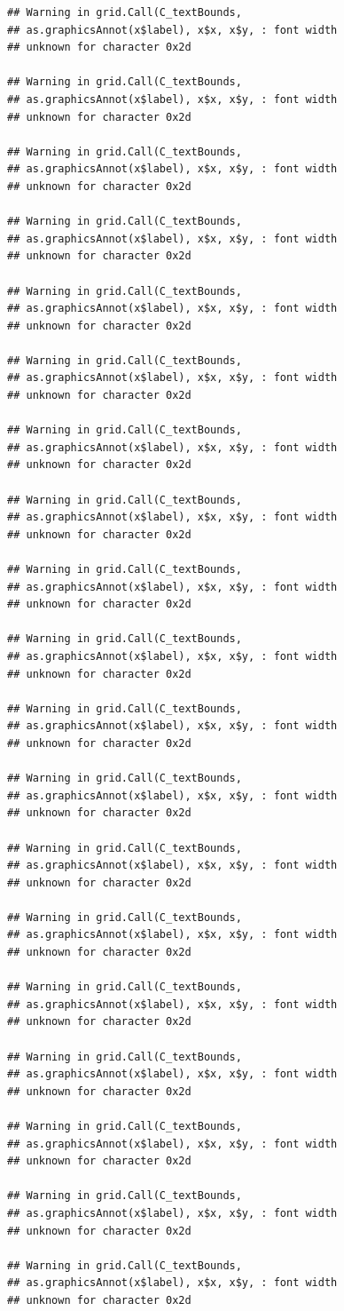 \documentclass[
]{book}
\begin{document}
\begin{verbatim}
## Warning in grid.Call(C_textBounds,
## as.graphicsAnnot(x$label), x$x, x$y, : font width
## unknown for character 0x2d

## Warning in grid.Call(C_textBounds,
## as.graphicsAnnot(x$label), x$x, x$y, : font width
## unknown for character 0x2d

## Warning in grid.Call(C_textBounds,
## as.graphicsAnnot(x$label), x$x, x$y, : font width
## unknown for character 0x2d

## Warning in grid.Call(C_textBounds,
## as.graphicsAnnot(x$label), x$x, x$y, : font width
## unknown for character 0x2d

## Warning in grid.Call(C_textBounds,
## as.graphicsAnnot(x$label), x$x, x$y, : font width
## unknown for character 0x2d

## Warning in grid.Call(C_textBounds,
## as.graphicsAnnot(x$label), x$x, x$y, : font width
## unknown for character 0x2d

## Warning in grid.Call(C_textBounds,
## as.graphicsAnnot(x$label), x$x, x$y, : font width
## unknown for character 0x2d

## Warning in grid.Call(C_textBounds,
## as.graphicsAnnot(x$label), x$x, x$y, : font width
## unknown for character 0x2d

## Warning in grid.Call(C_textBounds,
## as.graphicsAnnot(x$label), x$x, x$y, : font width
## unknown for character 0x2d

## Warning in grid.Call(C_textBounds,
## as.graphicsAnnot(x$label), x$x, x$y, : font width
## unknown for character 0x2d

## Warning in grid.Call(C_textBounds,
## as.graphicsAnnot(x$label), x$x, x$y, : font width
## unknown for character 0x2d

## Warning in grid.Call(C_textBounds,
## as.graphicsAnnot(x$label), x$x, x$y, : font width
## unknown for character 0x2d

## Warning in grid.Call(C_textBounds,
## as.graphicsAnnot(x$label), x$x, x$y, : font width
## unknown for character 0x2d

## Warning in grid.Call(C_textBounds,
## as.graphicsAnnot(x$label), x$x, x$y, : font width
## unknown for character 0x2d

## Warning in grid.Call(C_textBounds,
## as.graphicsAnnot(x$label), x$x, x$y, : font width
## unknown for character 0x2d

## Warning in grid.Call(C_textBounds,
## as.graphicsAnnot(x$label), x$x, x$y, : font width
## unknown for character 0x2d

## Warning in grid.Call(C_textBounds,
## as.graphicsAnnot(x$label), x$x, x$y, : font width
## unknown for character 0x2d

## Warning in grid.Call(C_textBounds,
## as.graphicsAnnot(x$label), x$x, x$y, : font width
## unknown for character 0x2d

## Warning in grid.Call(C_textBounds,
## as.graphicsAnnot(x$label), x$x, x$y, : font width
## unknown for character 0x2d
\end{verbatim}
\end{document}
